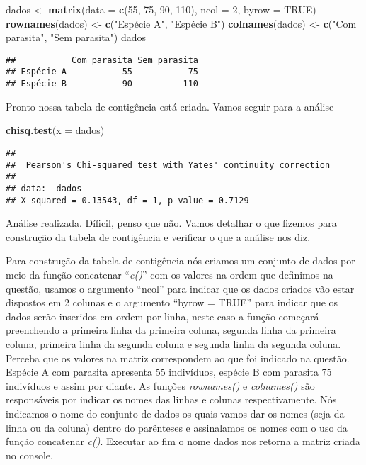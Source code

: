\documentclass[]{book}
\newenvironment{Shaded}{\begin{snugshade}}{\end{snugshade}}
\newcommand{\DataTypeTok}[1]{\textcolor[rgb]{0.13,0.29,0.53}{#1}}
\newcommand{\DecValTok}[1]{\textcolor[rgb]{0.00,0.00,0.81}{#1}}
\newcommand{\KeywordTok}[1]{\textcolor[rgb]{0.13,0.29,0.53}{\textbf{#1}}}
\newcommand{\NormalTok}[1]{#1}
\newcommand{\OtherTok}[1]{\textcolor[rgb]{0.56,0.35,0.01}{#1}}
\newcommand{\StringTok}[1]{\textcolor[rgb]{0.31,0.60,0.02}{#1}}
\begin{document}
\begin{Shaded}
\begin{Highlighting}[]
\NormalTok{dados <-}\StringTok{ }\KeywordTok{matrix}\NormalTok{(}\DataTypeTok{data =} \KeywordTok{c}\NormalTok{(}\DecValTok{55}\NormalTok{, }\DecValTok{75}\NormalTok{, }\DecValTok{90}\NormalTok{, }\DecValTok{110}\NormalTok{), }\DataTypeTok{ncol =} \DecValTok{2}\NormalTok{, }\DataTypeTok{byrow =} \OtherTok{TRUE}\NormalTok{)}
\KeywordTok{rownames}\NormalTok{(dados) <-}\StringTok{ }\KeywordTok{c}\NormalTok{(}\StringTok{"Espécie A"}\NormalTok{, }\StringTok{"Espécie B"}\NormalTok{)}
\KeywordTok{colnames}\NormalTok{(dados) <-}\StringTok{ }\KeywordTok{c}\NormalTok{(}\StringTok{"Com parasita"}\NormalTok{, }\StringTok{"Sem parasita"}\NormalTok{)}
\NormalTok{dados}
\end{Highlighting}
\end{Shaded}

\begin{verbatim}
##           Com parasita Sem parasita
## Espécie A           55           75
## Espécie B           90          110
\end{verbatim}

Pronto nossa tabela de contigência está criada. Vamos seguir para a análise

\begin{Shaded}
\begin{Highlighting}[]
\KeywordTok{chisq.test}\NormalTok{(}\DataTypeTok{x =}\NormalTok{ dados)}
\end{Highlighting}
\end{Shaded}

\begin{verbatim}
## 
##  Pearson's Chi-squared test with Yates' continuity correction
## 
## data:  dados
## X-squared = 0.13543, df = 1, p-value = 0.7129
\end{verbatim}

Análise realizada. Díficil, penso que não. Vamos detalhar o que fizemos para construção da tabela de contigência e verificar o que a análise nos diz.

Para construção da tabela de contigência nós criamos um conjunto de dados por meio da função concatenar ``\emph{c()}'' com os valores na ordem que definimos na questão, usamos o argumento ``ncol'' para indicar que os dados criados vão estar dispostos em 2 colunas e o argumento ``byrow = TRUE'' para indicar que os dados serão inseridos em ordem por linha, neste caso a função começará preenchendo a primeira linha da primeira coluna, segunda linha da primeira coluna, primeira linha da segunda coluna e segunda linha da segunda coluna. Perceba que os valores na matriz correspondem ao que foi indicado na questão. Espécie A com parasita apresenta 55 indivíduos, espécie B com parasita 75 indivíduos e assim por diante. As funções \emph{rownames()} e \emph{colnames()} são responsáveis por indicar os nomes das linhas e colunas respectivamente. Nós indicamos o nome do conjunto de dados os quais vamos dar os nomes (seja da linha ou da coluna) dentro do parênteses e assinalamos os nomes com o uso da função concatenar \emph{c()}. Executar ao fim o nome dados nos retorna a matriz criada no console.
\end{document}
